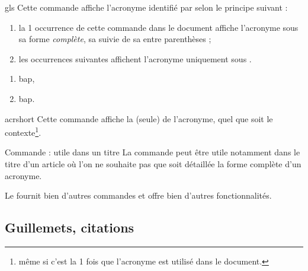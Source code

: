 \documentclass[french,nolocaltoc]{nwejmart}
\newtheorem[style=definition]{fait}
\newtheorem[title=contraventionnalisation]{ctrv}
\newtheorem[title-plural=anneaux]{anneau}
\newtheorem[title-plural=idéaux]{idéal}
\begin{document}
\begin{docCommand}{gls}{}
  Cette commande affiche l'acronyme identifié par  selon le principe
  suivant :
  \begin{enumerate}
  \item la 1\iere{} occurrence de cette commande dans le document affiche
    l'acronyme sous sa forme \emph{complète}, \ie*{} sa 
    suivie de sa  entre parenthèses ;
  \item les occurrences suivantes affichent l'acronyme uniquement sous
    .
  \end{enumerate}
\end{docCommand}

\begin{preamblecode}[listing options={alsolanguage={[glossaries]TeX}}]
\end{preamblecode}
\begin{bodycode}[listing and text,listing options={alsolanguage={[glossaries]TeX}}]
\begin{enumerate}
\item \gls{bap},
\item \gls{bap}.
\end{enumerate}
\end{bodycode}

\begin{docCommand}{acrshort}{}
  Cette commande affiche la  (seule) de l'acronyme, quel que
  soit le contexte\footnote{\Ie*{} même si c'est la 1\iere{} fois que l'acronyme
    est utilisé dans le document.}.
\end{docCommand}

\begin{dbremark}{Commande  : utile dans un titre}{}
  La commande  peut être utile notamment dans le titre d'un
  article où l'on ne souhaite pas que soit détaillée la forme complète d'un
  acronyme.
\end{dbremark}

Le  fournit bien d'autres commandes et offre bien d'autres
fonctionnalités\autocite[Pour plus de détails, cf. par exemple][]{Bitouze7}.

\subsection{Guillemets, citations}
\label{sec-guillemets-citations}
\end{document}
